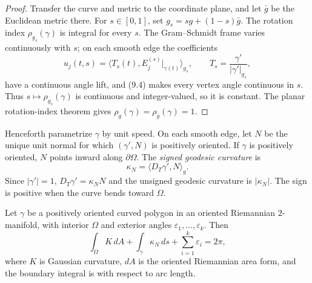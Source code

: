 \begin{proof}
\sketch
Transfer the curve and metric to the coordinate plane, and let $\bar g$ be the
Euclidean metric there.  For $s\in[0,1]$, set
$g_s=sg+(1-s)\bar g$.  The rotation index $\rho_{g_s}(\gamma)$ is integral for
every $s$.  The Gram--Schmidt frame varies continuously with $s$; on each
smooth edge the coefficients
\[
u_j(t,s)=\langle T_s(t),E_j^{(s)}|_{\gamma(t)}\rangle_{g_s},
\qquad
T_s=\frac{\gamma'}{|\gamma'|_{g_s}},
\]
have a continuous angle lift, and (9.4) makes every vertex angle continuous
in $s$.  Thus $s\mapsto\rho_{g_s}(\gamma)$ is continuous and integer-valued,
so it is constant.  The planar rotation-index theorem gives
$\rho_g(\gamma)=\rho_{\bar g}(\gamma)=1$.
\end{proof}

Henceforth parametrize $\gamma$ by unit speed.  On each smooth edge, let $N$
be the unique unit normal for which $(\gamma',N)$ is positively oriented.  If
$\gamma$ is positively oriented, $N$ points inward along $\partial\Omega$.
The \emph{signed geodesic curvature} is
\[
\kappa_N=\langle D_T\gamma',N\rangle_g.
\]
Since $|\gamma'|=1$,
$D_T\gamma'=\kappa_NN$ and the unsigned geodesic curvature is
$|\kappa_N|$.  The sign is positive when the curve bends toward $\Omega$.

\begin{theorem}
\label{thm:gauss-bonnet-formula}
Let $\gamma$ be a positively oriented curved polygon in an oriented
Riemannian $2$-manifold, with interior $\Omega$ and exterior angles
$\varepsilon_1,\ldots,\varepsilon_k$.  Then
\begin{equation}
\int_\Omega K\,dA+\int_\gamma\kappa_N\,ds
+\sum_{i=1}^k\varepsilon_i=2\pi, \tag{9.6}
\end{equation}
where $K$ is Gaussian curvature, $dA$ is the oriented Riemannian area form,
and the boundary integral is with respect to arc length.
\end{theorem}

